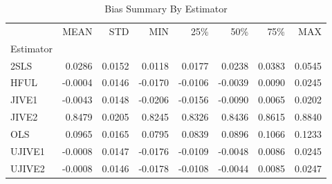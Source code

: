 \begin{table}[ht]
\centering
\caption{Bias Summary By Estimator}
\begin{tabular}{lrrrrrrr}
\toprule
 & MEAN & STD & MIN & 25\% & 50\% & 75\% & MAX \\
Estimator &  &  &  &  &  &  &  \\
\midrule
2SLS & 0.0286 & 0.0152 & 0.0118 & 0.0177 & 0.0238 & 0.0383 & 0.0545 \\
HFUL & -0.0004 & 0.0146 & -0.0170 & -0.0106 & -0.0039 & 0.0090 & 0.0245 \\
JIVE1 & -0.0043 & 0.0148 & -0.0206 & -0.0156 & -0.0090 & 0.0065 & 0.0202 \\
JIVE2 & 0.8479 & 0.0205 & 0.8245 & 0.8326 & 0.8436 & 0.8615 & 0.8840 \\
OLS & 0.0965 & 0.0165 & 0.0795 & 0.0839 & 0.0896 & 0.1066 & 0.1233 \\
UJIVE1 & -0.0008 & 0.0147 & -0.0176 & -0.0109 & -0.0048 & 0.0086 & 0.0245 \\
UJIVE2 & -0.0008 & 0.0146 & -0.0178 & -0.0108 & -0.0044 & 0.0085 & 0.0247 \\
\bottomrule
\end{tabular}
\end{table}
